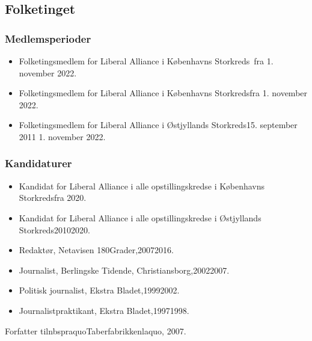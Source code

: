 \documentclass[11pt, a4paper]{awesome-cv}
\begin{document}
\begin{cvletter}
\subsection*{Folketinget}
\subsubsection*{Medlemsperioder}
\begin{itemize}
\item Folketingsmedlem for Liberal Alliance i Københavns Storkreds fra 1. november 2022.
\item Folketingsmedlem for Liberal Alliance i Københavns Storkredsfra 1. november 2022.
\item Folketingsmedlem for Liberal Alliance i Østjyllands Storkreds15. september 2011  1. november 2022.
\end{itemize}
\subsubsection*{Kandidaturer}
\begin{itemize}
\item Kandidat for Liberal Alliance i alle opstillingskredse i Københavns Storkredsfra 2020.
\item Kandidat for Liberal Alliance i alle opstillingskredse i Østjyllands Storkreds20102020.
\end{itemize}
\begin{itemize}
\item Redaktør, Netavisen 180Grader,20072016.
\item Journalist, Berlingske Tidende, Christiansborg,20022007.
\item Politisk journalist, Ekstra Bladet,19992002.
\item Journalistpraktikant, Ekstra Bladet,19971998.
\end{itemize}
Forfatter tilnbspraquoTaberfabrikkenlaquo, 2007.

\end{cvletter}
\end{document}
